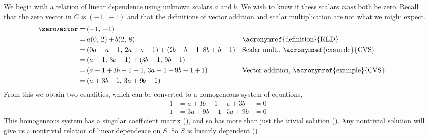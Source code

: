 We begin with a relation of linear dependence using unknown scalars $a$ and $b$.  We wish to know if these scalars {\em must} both be zero.  Recall that the zero vector in $C$ is $(-1,\,-1)$ and that the definitions of vector addition and scalar multiplication are not what we might expect.
%
\begin{align*}
\zerovector
&=(-1,\,-1)\\
&=a(0,\,2) +b(2,\,8)&&\text{\acronymref{definition}{RLD}}\\
&=(0a+a-1,\,2a+a-1) + (2b+b-1,\,8b+b-1)&&\text{Scalar mult., \acronymref{example}{CVS}}\\
&=(a-1,\,3a-1) + (3b-1,\,9b-1)\\
&=(a-1+3b-1+1,\,3a-1+9b-1+1)&&\text{Vector addition, \acronymref{example}{CVS}}\\
&=(a+3b-1,\,3a+9b-1)\\
\end{align*}
%
From this we obtain two equalities, which can be converted to a homogeneous system of equations,
%
\begin{align*}
-1&=a+3b-1&a+3b&=0\\
-1&=3a+9b-1&3a+9b&=0
\end{align*}
%
This homogeneous system has a singular coefficient matrix (), and so has more than just the trivial solution ().  Any nontrivial solution will give us a nontrivial relation of linear dependence on $S$.  So $S$ is linearly dependent ().